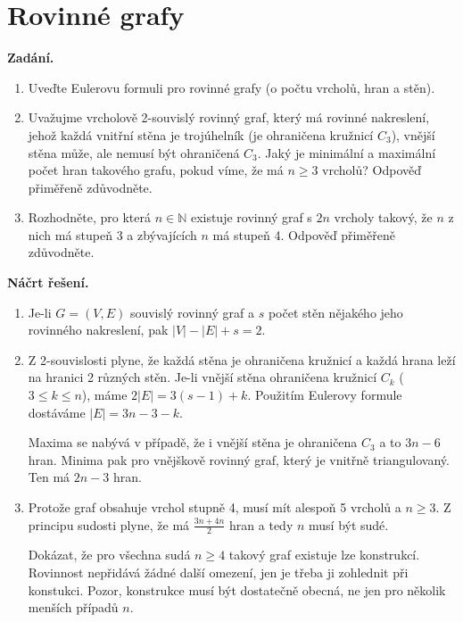 \section{Rovinné grafy}

\noindent\textbf{Zadání.}\par
\begin{enumerate}
  \item Uveďte Eulerovu formuli pro rovinné grafy (o počtu vrcholů, hran a stěn).
  \item Uvažujme vrcholově 2-souvislý rovinný graf, který má rovinné nakreslení, jehož každá vnitřní stěna je trojúhelník (je ohraničena kružnicí $C_3$), vnější stěna může, ale nemusí být ohraničená $C_3$. Jaký je minimální a maximální počet hran takového grafu, pokud víme, že má $n \geq 3$ vrcholů? Odpověď přiměřeně zdůvodněte.
  \item Rozhodněte, pro která $n \in \mathbb{N}$ existuje rovinný graf s $2n$ vrcholy takový, že $n$ z nich má stupeň 3 a zbývajících $n$ má stupeň 4. Odpověď přiměřeně zdůvodněte.
\end{enumerate}

\medskip
\noindent\textbf{Náčrt řešení.}\par
\begin{enumerate}
  \item Je-li $G = (V, E)$ souvislý rovinný graf a $s$ počet stěn nějakého jeho rovinného nakreslení, pak $|V| - |E| + s = 2$.
  \item Z 2-souvislosti plyne, že každá stěna je ohraničena kružnicí a každá hrana leží na hranici 2 různých stěn. Je-li vnější stěna ohraničena kružnicí $C_k$ ($3 \leq k \leq n$), máme $2|E| = 3(s - 1) + k$. Použitím Eulerovy formule dostáváme $|E| = 3n - 3 - k$.

    Maxima se nabývá v případě, že i vnější stěna je ohraničena $C_3$ a to $3n - 6$ hran. Minima pak pro vnějškově rovinný graf, který je vnitřně triangulovaný. Ten má $2n - 3$ hran.
  \item Protože graf obsahuje vrchol stupně 4, musí mít alespoň 5 vrcholů a $n \geq 3$. Z principu sudosti plyne, že má $\frac{3n + 4n}{2}$ hran a tedy $n$ musí být sudé.

    Dokázat, že pro všechna sudá $n \geq 4$ takový graf existuje lze konstrukcí. Rovinnost nepřidává žádné další omezení, jen je třeba ji zohlednit při konstukci. Pozor, konstrukce musí být dostatečně obecná, ne jen pro několik menších případů $n$.
\end{enumerate}

